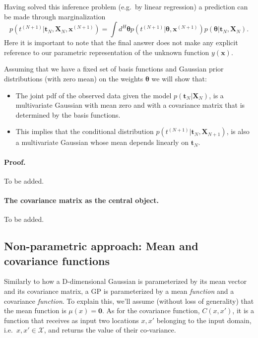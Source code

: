 \documentclass[%
oneside,                 %
final,                   %
10pt]{article}
\begin{document}
Having solved this inference problem (e.g.~by linear regression) a prediction can be made through marginalization
\[
p\left( t^{(N+1)} | \boldsymbol{t}_N, \boldsymbol{X}_{N}, \boldsymbol{x}^{(N+1)} \right) 
= \int d^H \boldsymbol{\theta} 
p\left( t^{(N+1)} | \boldsymbol{\theta}, \boldsymbol{x}^{(N+1)} \right)
p \left( \boldsymbol{\theta} | \boldsymbol{t}_N, \boldsymbol{X}_N \right).
\]
Here it is important to note that the final answer does not make any explicit reference to our parametric representation of the unknown function $y(\boldsymbol{x})$.

Assuming that we have a fixed set of basis functions and Gaussian prior distributions (with zero mean) on the weights $\boldsymbol{\theta}$ we will show that:

\begin{itemize}
\item The joint pdf of the observed data given the model $p( \boldsymbol{t}_N |  \boldsymbol{X}_N)$, is a multivariate Gaussian with mean zero and with a covariance matrix that is determined by the basis functions.

\item This implies that the conditional distribution $p( t^{(N+1)} | \boldsymbol{t}_N, \boldsymbol{X}_{N+1})$, is also a multivariate Gaussian whose mean depends linearly on $\boldsymbol{t}_N$.
\end{itemize}

\noindent
\paragraph{Proof.}
To be added.

\paragraph{The covariance matrix as the central object.}
To be added.

\subsection{Non-parametric approach: Mean and covariance functions}

Similarly to how a D-dimensional Gaussian is parameterized by its mean vector and its covariance matrix, a GP is parameterized by a mean \emph{function} and a covariance \emph{function}. To explain this, we'll assume (without loss of generality) that the mean function is $\mu(x) = \mathbf{0}$. As for the covariance function, $C(x,x')$, it is a function that receives as input two locations $x,x'$ belonging to the input domain, i.e.~$x,x' \in \mathcal{X}$, and returns the value of their co-variance.
\end{document}
